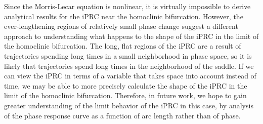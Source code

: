 \documentclass[12pt]{article}
\begin{document}
Since the Morris-Lecar equation is nonlinear, it is virtually impossible to derive analytical results for the iPRC near the homoclinic bifurcation.  However, the ever-lengthening regions of relatively small phase change suggest a different approach to understanding what happens to the shape of the iPRC in the limit of the homoclinic bifurcation.  The long, flat regions of the iPRC are a result of trajectories spending long times in a small neighborhood in phase space, so it is likely that trajectories spend long times in the neighborhood of the saddle.  If we can view the iPRC in terms of a variable that takes space into account instead of time, we may be able to more precisely calculate the shape of the iPRC in the limit of the homoclinic bifurcation.  Therefore, in future work, we hope to gain greater understanding of the limit behavior of the iPRC in this case, by analysis of the phase response curve as a function of arc length rather than of phase.  

\end{document}

